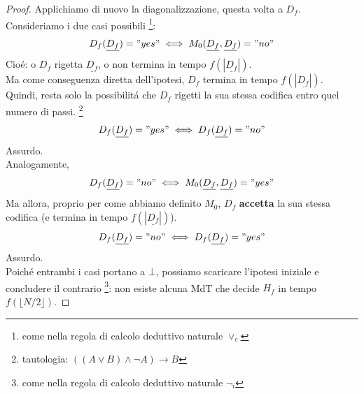\begin{proof}
Applichiamo di nuovo la diagonalizzazione, questa volta a $D_f$.
Consideriamo i due casi possibili \footnote{come nella regola di calcolo deduttivo naturale $\lor_e$}:
\[ D_f(\underline{D_f}) = "yes" \iff M_0(\underline{D_f}, \underline{D_f}) = "no" \]
Cioé: o $D_f$ rigetta $\underline{D_f}$, o non termina in tempo $f(|\underline{D_f}|)$. \\
Ma come conseguenza diretta dell'ipotesi, $D_f$ termina in tempo $f(|\underline{D_f}|)$. 
Quindi, resta solo la possibilitá che $D_f$ rigetti la sua stessa codifica entro quel numero di passi.
\footnote{tautologia: $((A \lor B ) \land \neg A) \rightarrow B$} \\
\[ D_f(\underline{D_f}) = "yes" \iff D_f(\underline{D_f}) = "no" \]
Assurdo. \\

Analogamente, 
\[ D_f(\underline{D_f}) = "no" \iff M_0(\underline{D_f}, \underline{D_f}) = "yes" \]
Ma allora, proprio per come abbiamo definito $M_0$, $D_f$ \textbf{accetta} la sua stessa codifica (e termina in tempo $f(|\underline{D_f}|)$).
\[D_f(\underline{D_f}) = "no" \iff D_f(\underline{D_f}) = "yes"\]
Assurdo. \\

Poiché entrambi i casi portano a $\bot$, possiamo scaricare l'ipotesi iniziale e concludere il contrario
\footnote{come nella regola di calcolo deduttivo naturale $\neg_i$}: 
non esiste alcuna MdT che decide $H_f$ in tempo $f(\lfloor N/2 \rfloor)$.
\end{proof}

